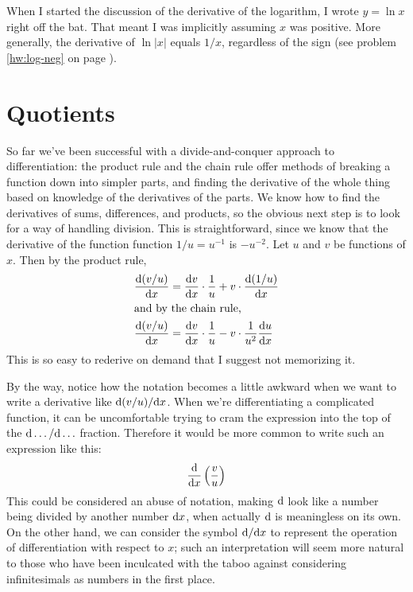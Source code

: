 When I started the discussion of the derivative of the logarithm, I wrote $y=\ln x$ right
off the bat. That meant I was implicitly assuming $x$ was positive.\label{log-neg}
More generally, the derivative of $\ln|x|$ equals $1/x$, regardless of the sign (see
problem \ref{hw:log-neg} on page \pageref{hw:log-neg}).

\section{Quotients}

So far we've been successful with a divide-and-conquer approach to differentiation:
the product rule and the chain rule offer methods of breaking a function down into
simpler parts, and finding the derivative of the whole thing based on knowledge of
the derivatives of the parts. We know how to find the derivatives of sums, differences,
and products, so the obvious next step is to look for a way of handling division.
This is straightforward, since we know that the derivative of the function function $1/u=u^{-1}$
is $-u^{-2}$.
Let $u$ and $v$ be functions of $x$. Then by the product rule,
\begin{align*}
  \frac{\textup{d}(v/u)}{\textup{d} x} &= \frac{\textup{d} v}{\textup{d} x}\cdot\frac{1}{u} + v\cdot \frac{\textup{d}(1/u)}{\textup{d} x} \\
\intertext{and by the chain rule,}
  \frac{\textup{d}(v/u)}{\textup{d} x} &= \frac{\textup{d} v}{\textup{d} x}\cdot\frac{1}{u} - v\cdot \frac{1}{u^2}\frac{\textup{d} u}{\textup{d} x}
\end{align*}
This is so easy to rederive on demand that I suggest not memorizing it.

By the way, notice how the notation becomes a little awkward when we want to write a derivative like
$\textup{d}(v/u)/\textup{d} x$. When we're differentiating a complicated function, it can be uncomfortable
trying to cram the expression into the top of the $\textup{d}\ldots/\textup{d}\ldots$ fraction. Therefore
it would be more common to write such an expression like this:
\begin{equation*}
  \frac{\textup{d}}{\textup{d} x} \left(\frac{v}{u}\right)
\end{equation*}
This could be considered an abuse of notation, making $\textup{d}$ look like a number being
divided by another number $\textup{d} x$, when actually $\textup{d}$ is meaningless on its own. On the other hand,
we can consider the symbol $\textup{d}/\textup{d} x$ to represent the operation of differentiation with respect to
$x$; such an interpretation will seem more natural to those who have been inculcated with the taboo
against considering infinitesimals as numbers in the first place.

